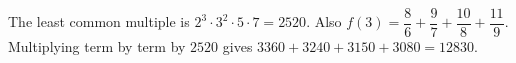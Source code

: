 The least common multiple is $2^3\cdot3^2\cdot5\cdot7=2520$. Also $f(3)=\dfrac{8}{6}+\dfrac{9}{7}+\dfrac{10}{8}+\dfrac{11}{9}$. Multiplying term by term by $2520$ gives $3360+3240+3150+3080=\boxed{12830}$.
